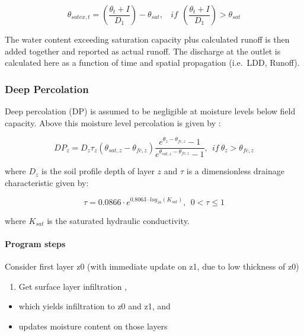 \documentclass[]{article}
\providecommand{\tightlist}{%
  \setlength{\itemsep}{0pt}\setlength{\parskip}{0pt}}
\let\oldparagraph\paragraph
\renewcommand{\paragraph}[1]{\oldparagraph{#1}\mbox{}}
\begin{document}
\begin{equation}
\theta_{satex,t}=(\frac{\theta_t+I}{D_1})-\theta_{sat},  ~~~~if~~(\frac{\theta_t+I}{D_1})>\theta_{sat}
\label{eq:thetat}  
\end{equation}

The water content exceeding saturation capacity plus calculated runoff
is then added together and reported as actual runoff. The discharge at
the outlet is calculated here as a function of time and spatial
propagation (i.e.~LDD, Runoff).

\subsubsection{Deep Percolation}\label{deep-percolation}

Deep percolation (DP) is assumed to be negligible at moisture levels
below field capacity. Above this moisture level percolation is given by
\cite{Raes2002}:

\begin{equation}
DP_z = D_z \tau_z (\theta_{sat, z} - \theta_{fc, z}) \frac{e^{\theta_z-\theta_{fc,z}}-1}{e^{\theta_{sat, z}-\theta_{fc,z}}-1},~~if~ \theta_z > \theta_{fc, z} 
\label{eq:DP}  
\end{equation}

where \(D_z\) is the soil profile depth of layer \(z\) and \(\tau\) is a
dimensionless drainage characteristic given by:

\begin{equation}
\tau = 0.0866 \cdot e^{0.8063 \cdot log_{10}(K_{sat})}, ~~0< \tau \leq 1
\label{eq:tau}  
\end{equation}

where \(K_{sat}\) is the saturated hydraulic conductivity.

\paragraph{Program steps}\label{program-steps}

Consider first layer z0 (with immediate update on z1, due to low
thickness of z0)

\begin{enumerate}
\def\labelenumi{\arabic{enumi}.}
\tightlist
\item
  Get surface layer infiltration ,
\end{enumerate}

\begin{itemize}
\tightlist
\item
  which yields infiltration to z0 and z1, and
\item
  updates moisture content on those layers
\end{itemize}
\end{document}
